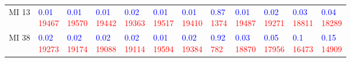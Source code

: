 \begin{tabular}{llllllllllll}
MI 13 & \makecell{\textcolor{blue}{0.01} \\ \textcolor{red}{19467}} & \makecell{\textcolor{blue}{0.01} \\ \textcolor{red}{19570}} & \makecell{\textcolor{blue}{0.01} \\ \textcolor{red}{19442}} & \makecell{\textcolor{blue}{0.02} \\ \textcolor{red}{19363}} & \makecell{\textcolor{blue}{0.01} \\ \textcolor{red}{19517}} & \makecell{\textcolor{blue}{0.01} \\ \textcolor{red}{19410}} & \makecell{\textcolor{blue}{0.87} \\ \textcolor{red}{1374}} & \makecell{\textcolor{blue}{0.01} \\ \textcolor{red}{19487}} & \makecell{\textcolor{blue}{0.02} \\ \textcolor{red}{19271}} & \makecell{\textcolor{blue}{0.03} \\ \textcolor{red}{18811}} & \makecell{\textcolor{blue}{0.04} \\ \textcolor{red}{18289}} \\
MI 38 & \makecell{\textcolor{blue}{0.02} \\ \textcolor{red}{19273}} & \makecell{\textcolor{blue}{0.02} \\ \textcolor{red}{19174}} & \makecell{\textcolor{blue}{0.02} \\ \textcolor{red}{19088}} & \makecell{\textcolor{blue}{0.02} \\ \textcolor{red}{19114}} & \makecell{\textcolor{blue}{0.01} \\ \textcolor{red}{19594}} & \makecell{\textcolor{blue}{0.02} \\ \textcolor{red}{19384}} & \makecell{\textcolor{blue}{0.92} \\ \textcolor{red}{782}} & \makecell{\textcolor{blue}{0.03} \\ \textcolor{red}{18870}} & \makecell{\textcolor{blue}{0.05} \\ \textcolor{red}{17956}} & \makecell{\textcolor{blue}{0.1} \\ \textcolor{red}{16473}} & \makecell{\textcolor{blue}{0.15} \\ \textcolor{red}{14909}} \\

\end{tabular}
